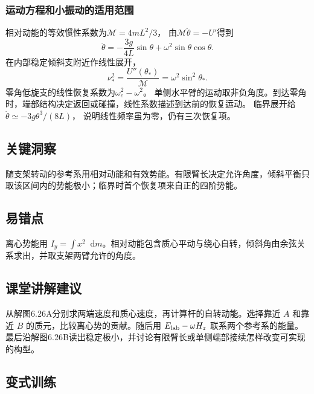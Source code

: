 \documentclass[UTF8,fontset=fandol,a4paper,11pt]{ctexart}
\newcommand{\dd}{\mathop{}\!\mathrm{d}}
\begin{document}
\subsubsection*{运动方程和小振动的适用范围}
相对动能的等效惯性系数为$\mathcal M=4mL^2/3$，
由$\mathcal M\ddot\theta=-U'$得到
\[
\ddot\theta=-\frac{3g}{4L}\sin\theta
+\omega^2\sin\theta\cos\theta.
\]
在内部稳定倾斜支附近作线性展开，
\[
\nu_*^2=\frac{U''(\theta_*)}{\mathcal M}
=\omega^2\sin^2\theta_*.
\]
零角低旋支的线性恢复系数为$\omega_c^2-\omega^2$。
单侧水平臂的运动取非负角度。到达零角时，端部结构决定返回或碰撞，线性系数描述到达前的恢复运动。
临界展开给$\ddot\theta\simeq-3g\theta^3/(8L)$，
说明线性频率虽为零，仍有三次恢复项。




\subsection*{关键洞察}

随支架转动的参考系用相对动能和有效势能。有限臂长决定允许角度，倾斜平衡只取该区间内的势能极小；临界时首个恢复项来自正的四阶势能。



\subsection*{易错点}

离心势能用 $I_y=\int x^2\dd m$。相对动能包含质心平动与绕心自转，倾斜角由余弦关系求出，并取支架两臂允许的角度。



\subsection*{课堂讲解建议}

从解图6.26A分别求两端速度和质心速度，再计算杆的自转动能。选择靠近 $A$ 和靠近 $B$ 的质元，比较离心势的贡献。随后用 $E_{\rm lab}-\omega H_z$ 联系两个参考系的能量。最后沿解图6.26B读出稳定极小，并讨论有限臂长或单侧端部接续怎样改变可实现的构型。



\subsection*{变式训练}
\end{document}
